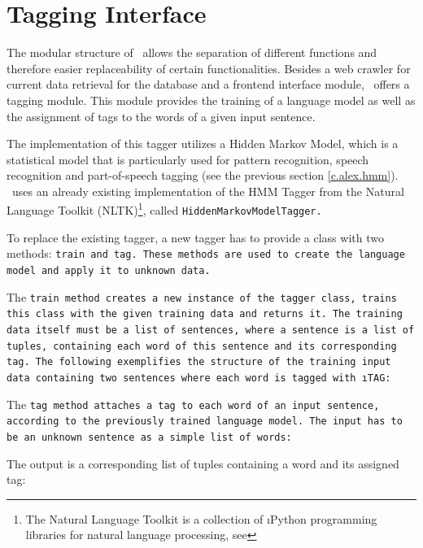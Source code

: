 \section{Tagging Interface}\label{c.alex.tagging}
The modular structure of \Alex\ allows the separation of different functions and therefore easier replaceability of certain functionalities. Besides a web crawler for current data retrieval for the database and a frontend interface module, \Alex\ offers a tagging module. This module provides the training of a language model as well as the assignment of tags to the words of a given input sentence.

The implementation of this tagger utilizes a Hidden Markov Model, which is a statistical model that is particularly used for pattern recognition, speech recognition and part-of-speech tagging (see the previous section \ref{c.alex.hmm}). \Alex\ uses an already existing implementation of the HMM Tagger from the Natural Language Toolkit (NLTK)\footnote{The Natural Language Toolkit is a collection of \i{Python} programming libraries for natural language processing, see }, called \tt{HiddenMarkovModelTagger}.

To replace the existing tagger, a new tagger has to provide a class with two methods: \tt{train} and \tt{tag}. These methods are used to create the language model and apply it to unknown data.

The \tt{train} method creates a new instance of the tagger class, trains this class with the given training data and returns it. The training data itself must be a list of sentences, where a sentence is a list of tuples, containing each word of this sentence and its corresponding tag. The following exemplifies the structure of the training input data containing two sentences where each word is tagged with \i{TAG}:



The \tt{tag} method attaches a tag to each word of an input sentence, according to the previously trained language model. The input has to be an unknown sentence as a simple list of words:



The output is a corresponding list of tuples containing a word and its assigned tag:




